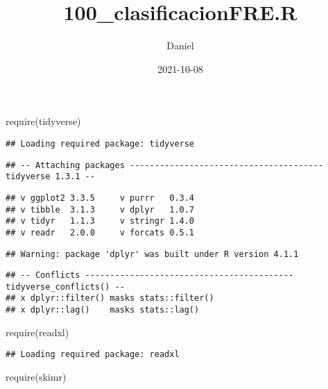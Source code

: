 \documentclass[
]{article}
\title{100\_clasificacionFRE.R}
\author{Daniel}
\date{2021-10-08}
\newenvironment{Shaded}{\begin{snugshade}}{\end{snugshade}}
\newcommand{\FunctionTok}[1]{\textcolor[rgb]{0.00,0.00,0.00}{#1}}
\newcommand{\NormalTok}[1]{#1}
\begin{document}
\maketitle

\begin{Shaded}
\begin{Highlighting}[]
\FunctionTok{require}\NormalTok{(tidyverse)}
\end{Highlighting}
\end{Shaded}

\begin{verbatim}
## Loading required package: tidyverse
\end{verbatim}

\begin{verbatim}
## -- Attaching packages --------------------------------------- tidyverse 1.3.1 --
\end{verbatim}

\begin{verbatim}
## v ggplot2 3.3.5     v purrr   0.3.4
## v tibble  3.1.3     v dplyr   1.0.7
## v tidyr   1.1.3     v stringr 1.4.0
## v readr   2.0.0     v forcats 0.5.1
\end{verbatim}

\begin{verbatim}
## Warning: package 'dplyr' was built under R version 4.1.1
\end{verbatim}

\begin{verbatim}
## -- Conflicts ------------------------------------------ tidyverse_conflicts() --
## x dplyr::filter() masks stats::filter()
## x dplyr::lag()    masks stats::lag()
\end{verbatim}

\begin{Shaded}
\begin{Highlighting}[]
\FunctionTok{require}\NormalTok{(readxl)}
\end{Highlighting}
\end{Shaded}

\begin{verbatim}
## Loading required package: readxl
\end{verbatim}

\begin{Shaded}
\begin{Highlighting}[]
\FunctionTok{require}\NormalTok{(skimr)}
\end{Highlighting}
\end{Shaded}
\end{document}
